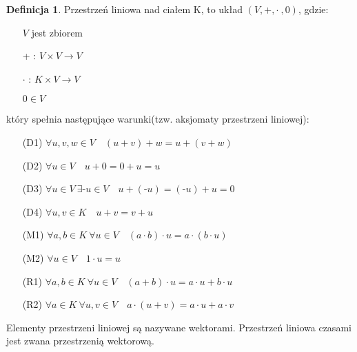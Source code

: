 \documentclass[12pt,a4paper]{article}
\theoremstyle{plain}
\theoremstyle{definition}
\theoremstyle{definition}
\newtheorem{df}{Definicja}[section]
\theoremstyle{definition}
\theoremstyle{definition}
\theoremstyle{definition}
\theoremstyle{definition}
\theoremstyle{definition}
\theoremstyle{definition}
\begin{document}
\begin{df}
Przestrzeń liniowa nad ciałem K, to układ $(V,+,\cdot\ ,0)$, gdzie:
\begin{itemize} 
        \item[] $V$ jest zbiorem
        \item[+]: $V \times V \rightarrow V$
        \item[$\cdot$]: $K \times V \rightarrow V$
        \item[] $0 \in V$
    \end{itemize} 
    który spełnia następujące warunki(tzw. aksjomaty przestrzeni liniowej): 
    \begin{itemize}
        \item[(D1)] $\forall u, v, w \in V \quad (u+v)+w = u + (v+w)$
        \item[(D2)] $\forall u \in V \quad u+0 = 0+u = u$
        \item[(D3)] $\forall u \in V \ \exists \text{-}u \in V \quad u + (\text{-}u) = (\text{-}u) + u = 0$
        \item[(D4)] $\forall u, v \in K \quad u+v = v+u$
        \item[(M1)] $\forall a, b \in K\  \forall u \in V \quad (a\cdot b)\cdot u = a\cdot (b\cdot u) $
        \item[(M2)] $\forall u \in V \quad 1\cdot u = u$
        \item[(R1)] $ \forall a,b \in K\ \forall u \in V \quad (a+b)\cdot u = a\cdot u + b\cdot u $
        \item[(R2)] $ \forall a \in K\ \forall u,v \in V \quad a\cdot (u+v) = a\cdot u + a\cdot v $
    \end{itemize}
    \vspace{5mm}
    Elementy przestrzeni liniowej są nazywane wektorami. 
    Przestrzeń liniowa czasami jest zwana przestrzenią wektorową.
\end{df}
\end{document}

